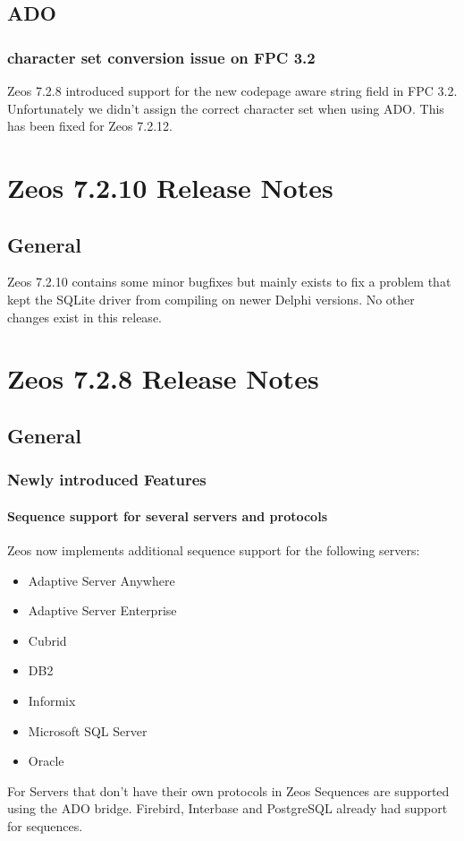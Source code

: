\documentclass[a4paper,12pt,oneside]{book}
\begin{document}
\section{ADO}
\subsection{character set conversion issue on FPC 3.2}
Zeos 7.2.8 introduced support for the new codepage aware string field in FPC 3.2.
Unfortunately we didn't assign the correct character set when using ADO.
This has been fixed for Zeos 7.2.12.

\chapter{Zeos 7.2.10 Release Notes}

\section{General}
\label{sec:Rev8_General}
Zeos 7.2.10 contains some minor bugfixes but mainly exists to fix a problem that kept the SQLite driver from compiling on newer Delphi versions.
No other changes exist in this release.

\chapter{Zeos 7.2.8 Release Notes}

\section{General}
\label{sec:Rev10_General}

\subsection{Newly introduced Features}
\label{sec:Rev8_General_Features}

\subsubsection{Sequence support for several servers and protocols}
\label{sec:Rev8_General_Features_Sequences}
Zeos now implements additional sequence support for the following servers:
\begin{itemize}
\item Adaptive Server Anywhere
\item Adaptive Server Enterprise
\item Cubrid
\item DB2
\item Informix
\item Microsoft SQL Server
\item Oracle
\end{itemize}
For Servers that don't have their own protocols in Zeos Sequences are supported using the ADO bridge.
Firebird, Interbase and PostgreSQL already had support for sequences.
\end{document}

